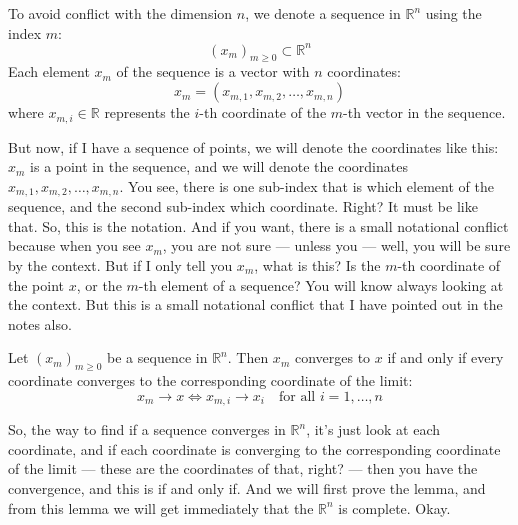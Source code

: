 \begin{math-stroke}
To avoid conflict with the dimension $n$, we denote a sequence in $\mathbb{R}^n$ using the index $m$:
\[ (x_m)_{m \ge 0} \subset \mathbb{R}^n \]
Each element $x_m$ of the sequence is a vector with $n$ coordinates:
\[ x_m = (x_{m,1}, x_{m,2}, \dots, x_{m,n}) \]
where $x_{m,i} \in \mathbb{R}$ represents the $i$-th coordinate of the $m$-th vector in the sequence.
\end{math-stroke}

\begin{spoken-clean}[00:14:12 - 00:15:50]
But now, if I have a sequence of points, we will denote the coordinates like this: $x_m$ is a point in the sequence, and we will denote the coordinates $x_{m,1}, x_{m,2}, \dots, x_{m,n}$.  You see, there is one sub-index that is which element of the sequence, and the second sub-index which coordinate. Right? It must be like that. So, this is the notation. And if you want, there is a small notational conflict because when you see $x_m$, you are not sure --- unless you --- well, you will be sure by the context. But if I only tell you $x_m$, what is this? Is the $m$-th coordinate of the point $x$, or the $m$-th element of a sequence? You will know always looking at the context. But this is a small notational conflict that I have pointed out in the notes also.
\end{spoken-clean}

\begin{nice-box}
\begin{lemma}\label{lem:coordinate-convergence}
Let $(x_m)_{m \ge 0}$ be a sequence in $\mathbb{R}^n$. Then $x_m$ converges to $x$ if and only if every coordinate converges to the corresponding coordinate of the limit:
\[ x_m \to x \iff x_{m,i} \to x_i \quad \text{for all } i = 1, \dots, n \]
\end{lemma}
\end{nice-box}

\begin{spoken-clean}[00:15:51 - 00:17:20]
So, the way to find if a sequence converges in $\mathbb{R}^n$, it's just look at each coordinate, and if each coordinate is converging to the corresponding coordinate of the limit --- these are the coordinates of that, right? --- then you have the convergence, and this is if and only if. And we will first prove the lemma, and from this lemma we will get immediately that the $\mathbb{R}^n$ is complete. Okay.
\end{spoken-clean}

